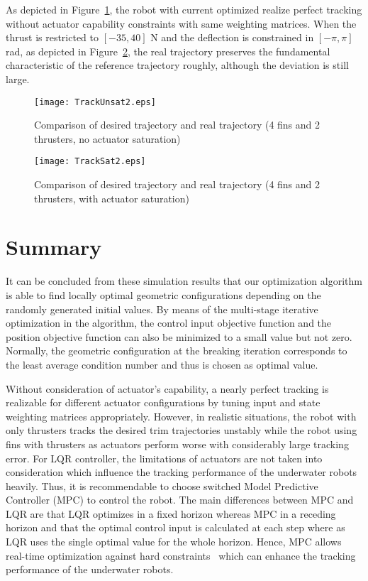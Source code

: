 As depicted in Figure~\ref{FIG:TrackUnsat2}, the robot with current optimized realize perfect tracking without actuator capability constraints with same weighting matrices. When the thrust is restricted to $[-35,40]$ N and the deflection is constrained in $[-\pi,\pi]$ rad, as depicted in Figure~\ref{FIG:TrackSat2}, the real trajectory preserves the fundamental characteristic of the reference trajectory roughly, although the deviation is still large.
\begin{figure}
\texttt{[image: TrackUnsat2.eps]}
\caption{Comparison of desired trajectory and real trajectory (4 fins and 2 thrusters, no actuator saturation)}	
\label{FIG:TrackUnsat2}
\end{figure}
\begin{figure}
\texttt{[image: TrackSat2.eps]}
\caption{Comparison of desired trajectory and real trajectory (4 fins and 2 thrusters, with actuator saturation)}	
\label{FIG:TrackSat2}
\end{figure}

\section{Summary}
It can be concluded from these simulation results that our optimization algorithm is able to find locally optimal geometric configurations depending on the randomly generated initial values. By means of the multi-stage iterative optimization in the algorithm, the control input objective function and the position objective function can also be minimized to a small value but not zero. Normally, the geometric configuration at the breaking iteration corresponds to the least average condition number and thus is chosen as optimal value. 

Without consideration of actuator's capability, a nearly perfect tracking is realizable for different actuator configurations by tuning input and state weighting matrices appropriately. However, in realistic situations, the robot with only thrusters tracks the desired trim trajectories unstably while the robot using fins with thrusters as actuators perform worse with considerably large tracking error. For LQR controller, the limitations of actuators are not taken into consideration which influence the tracking performance of the underwater robots heavily. Thus, it is recommendable to choose switched Model Predictive Controller (MPC) to control the robot. The main differences between MPC and LQR are that LQR optimizes in a fixed horizon whereas MPC in a receding horizon and that the optimal control input is calculated at each step where as LQR uses the single optimal value for the whole horizon. Hence, MPC allows real-time optimization against hard constraints~\cite{Wang2009} which can enhance the tracking performance of the underwater robots.

 







